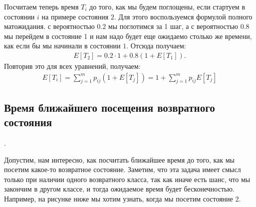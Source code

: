 \documentclass[12pt]{article}
\begin{document}
\begin{center}
\end{center}

Посчитаем теперь время $T_i$ до того, как мы будем поглощены, если стартуем в состоянии $i$ на примере состояния $2$. Для этого воспользуемся формулой полного матожидания. с вероятностью $0.2$ мы поглотимся за 1 шаг, а с вероятностью $0.8$ мы перейдем в состояние 1 и нам надо будет еще ожидаемо столько же времени, как если бы мы начинали в состоянии $1$. Отсюда получаем:
\begin{align*}
  E[T_2] = 0.2 \cdot 1 + 0.8 (1 + E[T_1]).
\end{align*}
Повторив это для всех уравнений, получаем:
\begin{align*}
  E[T_i] = \sum_{j = 1}^m p_{ij} (1 + E[T_j]) = 1 + \sum_{j = 1}^m p_{ij} E[T_j]
\end{align*}

\subsection{Время ближайшего посещения возвратного состояния}.

Допустим, нам интересно, как посчитать ближайшее время до того, как мы посетим какое-то возвратное состояние. Заметим, что эта задача имеет смысл только при наличии одного возвратного класса, так как иначе есть шанс, что мы закончим в другом классе, и тогда ожидаемое время будет бесконечностью. Например, на рисунке ниже мы хотим узнать, когда мы посетим состояние 2. 
\end{document}
